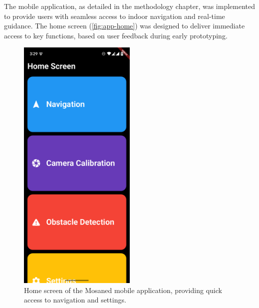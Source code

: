 The mobile application, as detailed in the methodology chapter, was implemented to provide users with seamless access to indoor navigation and real-time guidance. The home screen (\autoref{fig:app-home}) was designed to deliver immediate access to key functions, based on user feedback during early prototyping.
\begin{figure}[h]
	\centering
	\includegraphics[width=0.5\textwidth]{assets/ch5_imp/mobile_app_homescreen.png}
	\caption{Home screen of the Mosaned mobile application, providing quick access to navigation and settings.}
	\label{fig:app-home}
\end{figure}

